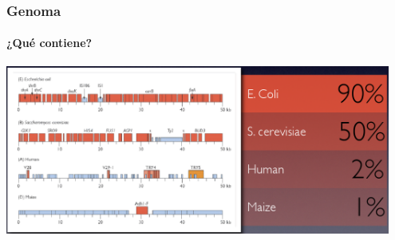 \begin{frame}
\frametitle{Genoma}
\framesubtitle{¿Qué contiene?}
\begin{center}
	\includegraphics[width=0.95\textwidth]{img/genes}
\end{center}
\end{frame}

